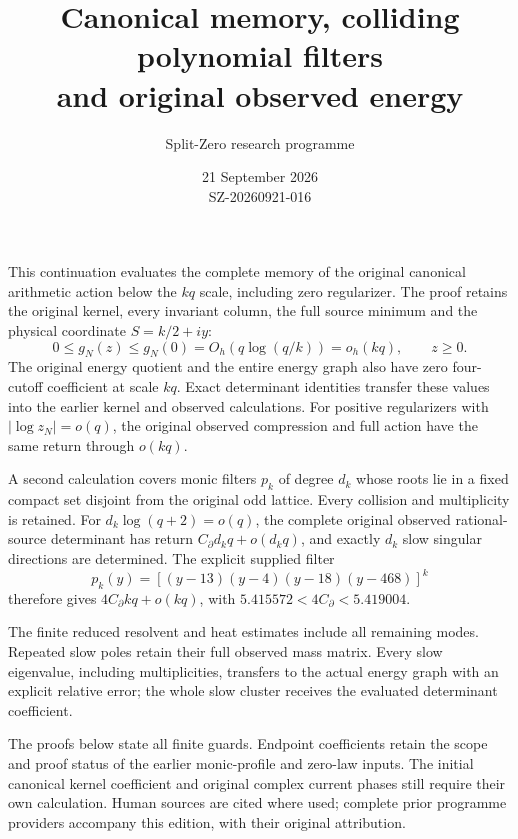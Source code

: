 \documentclass[11pt]{article}
\title{Canonical memory, colliding polynomial filters\\and original observed energy}
\author{Split-Zero research programme}
\date{21 September 2026\\SZ-20260921-016}
\begin{document}
\maketitle
This continuation evaluates the complete memory of the original canonical
arithmetic action below the $kq$ scale, including zero regularizer. The
proof retains the original kernel, every invariant column, the full
source minimum and the physical coordinate $S=k/2+iy$:
\[
0\le g_N(z)\le g_N(0)
=O_h(q\log(q/k))=o_h(kq),\qquad z\ge0.
\]
The original energy quotient and the entire energy graph also have zero
four-cutoff coefficient at scale $kq$. Exact determinant identities
transfer these values into the earlier kernel and observed calculations.
For positive regularizers with $|\log z_N|=o(q)$, the original observed
compression and full action have the same return through $o(kq)$.

A second calculation covers monic filters $p_k$ of degree $d_k$ whose
roots lie in a fixed compact set disjoint from the original odd lattice.
Every collision and multiplicity is retained. For
$d_k\log(q+2)=o(q)$, the complete original observed rational-source
determinant has return $C_\partial d_kq+o(d_kq)$, and exactly $d_k$
slow singular directions are determined. The explicit supplied filter
\[
p_k(y)=[(y-13)(y-4)(y-18)(y-468)]^k
\]
therefore gives $4C_\partial kq+o(kq)$, with
$5.415572<4C_\partial<5.419004$.

The finite reduced resolvent and heat estimates include all remaining
modes. Repeated slow poles retain their full observed mass matrix.
Every slow eigenvalue, including multiplicities, transfers to the
actual energy graph with an explicit relative error; the whole slow
cluster receives the evaluated determinant coefficient.

The proofs below state all finite guards. Endpoint coefficients retain
the scope and proof status of the earlier monic-profile and zero-law
inputs. The initial canonical kernel coefficient and original complex
current phases still require their own calculation. Human sources are
cited where used; complete prior programme providers accompany this
edition, with their original attribution.
\begingroup\small\tableofcontents\endgroup\clearpage
\end{document}
